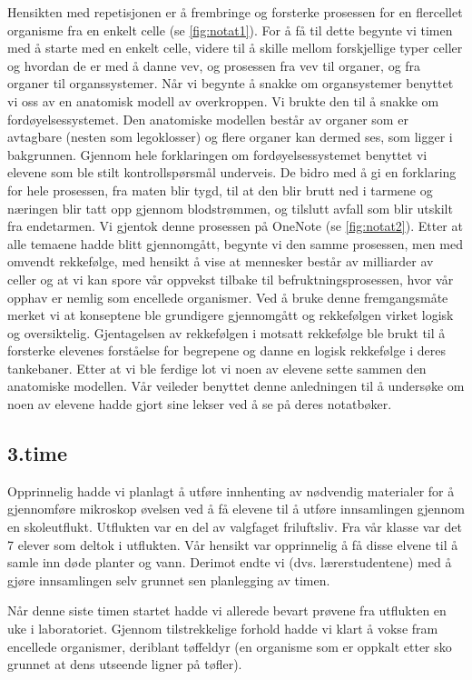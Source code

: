 \documentclass[main.tex]{subfiles}
\begin{document}
Hensikten med repetisjonen er å frembringe og forsterke prosessen for en flercellet organisme fra 
en enkelt celle (se \ref{fig:notat1}). For å få til dette begynte vi timen med å starte med en 
enkelt celle, videre til å skille mellom forskjellige typer celler og hvordan de er med å danne 
vev, og prosessen fra vev til organer, og fra organer til organssystemer. Når vi begynte å snakke
om organsystemer benyttet vi oss av en anatomisk modell av overkroppen. Vi brukte den til å snakke 
om fordøyelsessystemet.
Den anatomiske modellen består av organer som er avtagbare (nesten som legoklosser) og flere organer 
kan dermed ses, som ligger i bakgrunnen. Gjennom hele forklaringen om fordøyelsessystemet benyttet 
vi elevene som ble stilt kontrollspørsmål underveis. De bidro med å gi en forklaring for hele prosessen, 
fra maten blir tygd, til at den blir brutt ned i tarmene og næringen blir tatt opp gjennom blodstrømmen, 
og tilslutt avfall som blir utskilt fra endetarmen. Vi gjentok denne prosessen på OneNote (se 
\ref{fig:notat2}). Etter at alle temaene hadde blitt gjennomgått, begynte vi den samme prosessen, 
men med omvendt rekkefølge, med hensikt å vise at mennesker består av milliarder av celler og 
at vi kan spore vår oppvekst tilbake til befruktningsprosessen, hvor vår opphav er nemlig som
encellede organismer. Ved å bruke denne fremgangsmåte merket vi at konseptene ble grundigere
gjennomgått og rekkefølgen virket logisk og oversiktelig. Gjentagelsen av rekkefølgen i motsatt
rekkefølge ble brukt til å forsterke elevenes forståelse for begrepene og danne en logisk 
rekkefølge i deres tankebaner. Etter at vi ble ferdige lot vi noen av elevene sette sammen
den anatomiske modellen. Vår veileder benyttet denne anledningen til å undersøke om noen
av elevene hadde gjort sine lekser ved å se på deres notatbøker.

\subsection*{3.time}
Opprinnelig hadde vi planlagt å utføre innhenting av nødvendig materialer for å gjennomføre 
mikroskop øvelsen ved å få elevene til å utføre innsamlingen gjennom en skoleutflukt. Utflukten var 
en del av valgfaget friluftsliv. Fra vår klasse var det 7 elever som deltok i utflukten. Vår hensikt
var opprinnelig å få disse elvene til å samle inn døde planter og vann. Derimot endte vi (dvs. 
lærerstudentene) med å gjøre innsamlingen selv grunnet sen planlegging av timen. 

Når denne siste timen startet hadde vi allerede bevart prøvene fra utflukten en uke i laboratoriet. 
Gjennom tilstrekkelige forhold hadde vi klart å vokse fram encellede organismer, deriblant tøffeldyr 
(en organisme som er oppkalt etter sko grunnet at dens utseende ligner på tøfler).
\end{document}
